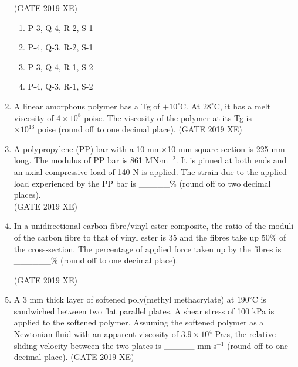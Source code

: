 \documentclass[journal,12pt,onecolumn]{IEEEtran}
\begin{document}
\begin{enumerate}


\hfill{(GATE 2019 XE)} \\
\begin{multicols}{2}
\begin{enumerate}
\item P-3, Q-4, R-2, S-1
\item P-4, Q-3, R-2, S-1
\item P-3, Q-4, R-1, S-2
\item P-4, Q-3, R-1, S-2
\end{enumerate}
\end{multicols}

\item A linear amorphous polymer has a Tg of $+10^\circ$C. At $28^\circ$C, it has a melt viscosity of $4\times10^{8}$ poise. The viscosity of the polymer at its Tg is \_\_\_\_\_\_ $\times10^{13}$ poise (round off to one decimal place).
\hfill{(GATE 2019 XE)} \\


\item A polypropylene (PP) bar with a 10 mm$\times$10 mm square section is 225 mm long. The modulus of PP bar is 861 MN$\cdot$m$^{-2}$. It is pinned at both ends and an axial compressive load of 140 N is applied. The strain due to the applied load experienced by the PP bar is \_\_\_\_\_\% (round off to two decimal places).\\
\hfill{(GATE 2019 XE)} \\

\item In a unidirectional carbon fibre/vinyl ester composite, the ratio of the moduli of the carbon fibre to that of vinyl ester is 35 and the fibres take up 50\% of the cross-section. The percentage of applied force taken up by the fibres is \_\_\_\_\_\_\% (round off to one decimal place).

\hfill{(GATE 2019 XE)} \\


\item A 3 mm thick layer of softened poly(methyl methacrylate) at $190^\circ$C is sandwiched between two flat parallel plates. A shear stress of 100 kPa is applied to the softened polymer. Assuming the softened polymer as a Newtonian fluid with an apparent viscosity of $3.9\times10^{4}$ Pa$\cdot$s, the relative sliding velocity between the two plates is \_\_\_\_\_ mm$\cdot$s$^{-1}$ (round off to one decimal place).
\hfill{(GATE 2019 XE)} \\




\end{enumerate}
\end{document}

